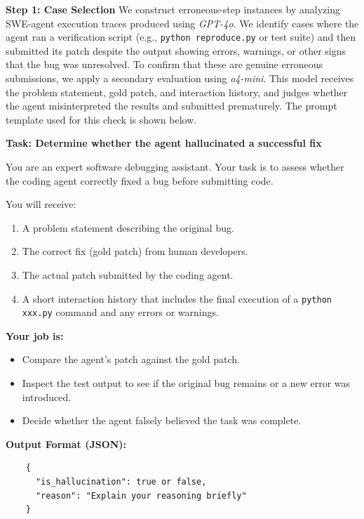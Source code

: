 \textbf{Step 1: Case Selection}
We construct erroneous-step instances by analyzing SWE-agent execution traces produced using \textit{GPT-4o}. We identify cases where the agent ran a verification script (e.g., \texttt{python reproduce.py} or test suite) and then submitted its patch despite the output showing errors, warnings, or other signs that the bug was unresolved. To confirm that these are genuine erroneous submissions, we apply a secondary evaluation using \textit{o4-mini}. This model receives the problem statement, gold patch, and interaction history, and judges whether the agent misinterpreted the results and submitted prematurely. The prompt template used for this check is shown below.


 \begin{promptbox}
    \noindent\textbf{Task: Determine whether the agent hallucinated a successful fix}

    You are an expert software debugging assistant. Your task is to assess whether the coding agent correctly fixed a bug before submitting code.
    
    You will receive:
    \begin{enumerate}
      \item A problem statement describing the original bug.
      \item The correct fix (gold patch) from human developers.
      \item The actual patch submitted by the coding agent.
      \item A short interaction history that includes the final execution of a \texttt{python xxx.py} command and any errors or warnings.
    \end{enumerate}
    
    \noindent\textbf{Your job is:}
    \begin{itemize}
      \item Compare the agent's patch against the gold patch.
      \item Inspect the test output to see if the original bug remains or a new error was introduced.
      \item Decide whether the agent falsely believed the task was complete.
    \end{itemize}
    
    \noindent\textbf{Output Format (JSON):}
    \begin{verbatim}
    {
      "is_hallucination": true or false,
      "reason": "Explain your reasoning briefly"
    }
    \end{verbatim}
\end{promptbox}
 


